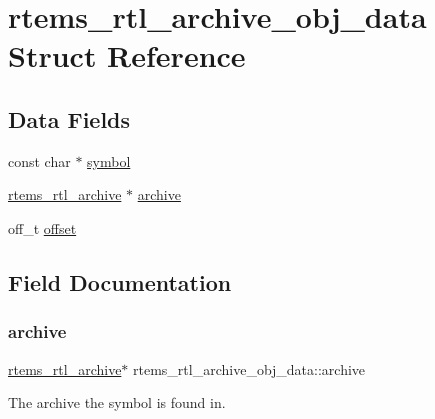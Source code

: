\hypertarget{structrtems__rtl__archive__obj__data}{}\section{rtems\+\_\+rtl\+\_\+archive\+\_\+obj\+\_\+data Struct Reference}
\label{structrtems__rtl__archive__obj__data}
\subsection*{Data Fields}
\begin{DoxyCompactItemize}
\item 
const char $\ast$ \mbox{\hyperlink{structrtems__rtl__archive__obj__data_ae132748440aea053c48ec0b2f7f26dcd}{symbol}}
\item 
\mbox{\hyperlink{structrtems__rtl__archive}{rtems\+\_\+rtl\+\_\+archive}} $\ast$ \mbox{\hyperlink{structrtems__rtl__archive__obj__data_ae130ec09dcef6f3c7ef6bcc7028a8a18}{archive}}
\item 
off\+\_\+t \mbox{\hyperlink{structrtems__rtl__archive__obj__data_a4cfce14cd2d86f1dfd80d75223c984df}{offset}}
\end{DoxyCompactItemize}


\subsection{Field Documentation}
\mbox{\label{structrtems__rtl__archive__obj__data_ae130ec09dcef6f3c7ef6bcc7028a8a18}} 
\subsubsection{\texorpdfstring{archive}{archive}}
{\footnotesize\ttfamily \mbox{\hyperlink{structrtems__rtl__archive}{rtems\+\_\+rtl\+\_\+archive}}$\ast$ rtems\+\_\+rtl\+\_\+archive\+\_\+obj\+\_\+data\+::archive}

The archive the symbol is found in. \mbox{\label{structrtems__rtl__archive__obj__data_a4cfce14cd2d86f1dfd80d75223c984df}} 
